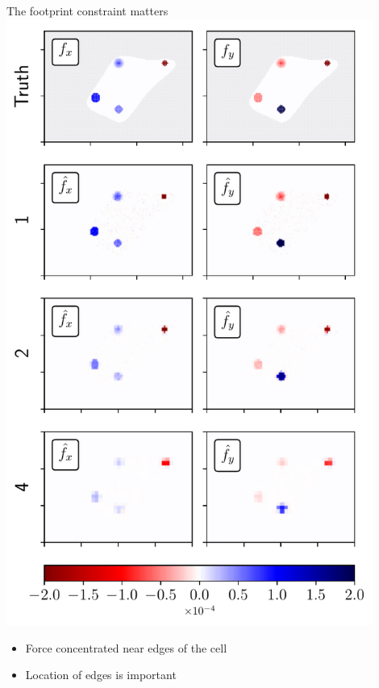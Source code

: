 \documentclass[presentation,aspectratio=169]{beamer}
\begin{document}
\begin{frame}{The footprint constraint matters}
\centering
\includegraphics[width=0.9\textwidth]{figures/fig4}
\begin{itemize}
\item Force concentrated near edges of the cell
\item Location of edges is important
\end{itemize}
\end{frame}
\end{document}
